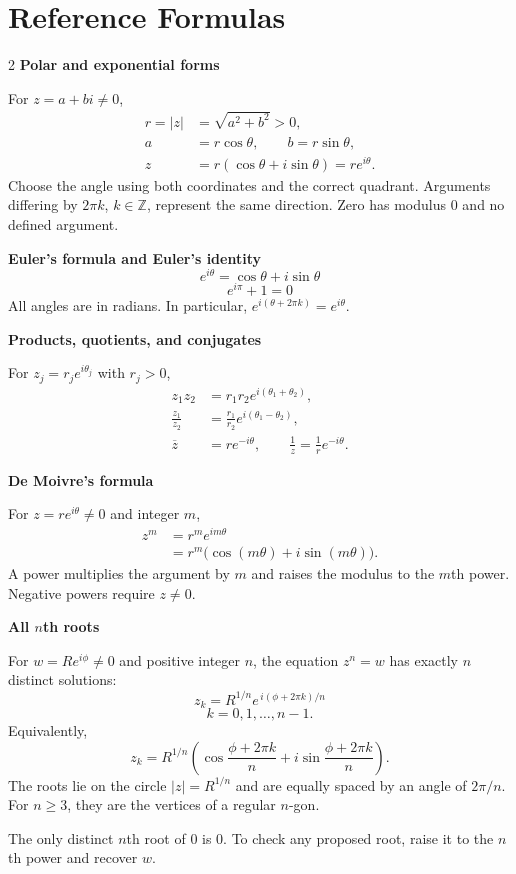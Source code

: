 \documentclass[11pt]{article}
\begin{document}
\section*{Reference Formulas}
\begin{multicols}{2}
\small
\textbf{Polar and exponential forms}

For $z=a+bi\ne0$,
\[
\begin{aligned}
  r=|z|&=\sqrt{a^2+b^2}>0,\\
  a&=r\cos\theta,\qquad b=r\sin\theta,\\
  z&=r(\cos\theta+i\sin\theta)=re^{i\theta}.
\end{aligned}
\]
Choose the angle using both coordinates and the correct quadrant.
Arguments differing by $2\pi k$, $k\in\mathbb Z$, represent the same direction.
Zero has modulus $0$ and no defined argument.

\medskip
\textbf{Euler's formula and Euler's identity}
\[
  e^{i\theta}=\cos\theta+i\sin\theta
\]
\[
  e^{i\pi}+1=0
\]
All angles are in radians. In particular, $e^{i(\theta+2\pi k)}=e^{i\theta}$.

\medskip
\textbf{Products, quotients, and conjugates}

For $z_j=r_je^{i\theta_j}$ with $r_j>0$,
\[
\begin{aligned}
  z_1z_2&=r_1r_2e^{i(\theta_1+\theta_2)},\\
  \frac{z_1}{z_2}&=\frac{r_1}{r_2}e^{i(\theta_1-\theta_2)},\\
  \overline z&=re^{-i\theta},\qquad
  \frac1z=\frac1r e^{-i\theta}.
\end{aligned}
\]

\columnbreak
\textbf{De Moivre's formula}

For $z=re^{i\theta}\ne0$ and integer $m$,
\[
\begin{aligned}
  z^m&=r^m e^{im\theta}\\
     &=r^m\bigl(\cos(m\theta)+i\sin(m\theta)\bigr).
\end{aligned}
\]
A power multiplies the argument by $m$ and raises the modulus to the
$m$th power. Negative powers require $z\ne0$.

\medskip
\textbf{All $n$th roots}

For $w=Re^{i\phi}\ne0$ and positive integer $n$, the equation $z^n=w$ has
exactly $n$ distinct solutions:
\[
  \boxed{z_k=R^{1/n}e^{\,i(\phi+2\pi k)/n}}
\]
\[
  k=0,1,\ldots,n-1.
\]
Equivalently,
\[
  z_k=R^{1/n}\left(\cos\frac{\phi+2\pi k}{n}
  +i\sin\frac{\phi+2\pi k}{n}\right).
\]
The roots lie on the circle $|z|=R^{1/n}$ and are equally spaced by an angle
of $2\pi/n$. For $n\ge3$, they are the vertices of a regular $n$-gon.

\medskip
The only distinct $n$th root of $0$ is $0$. To check any proposed root,
raise it to the $n$th power and recover $w$.
\end{multicols}
\end{document}
